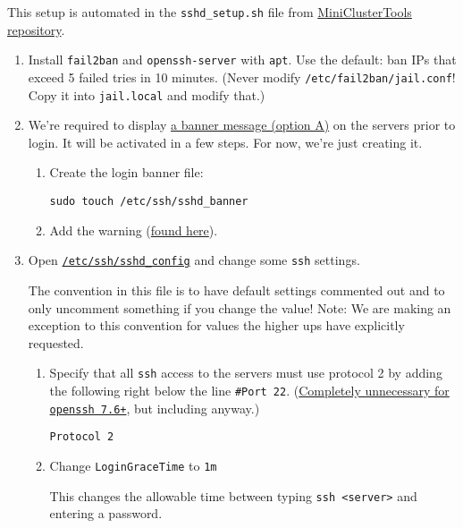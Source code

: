This setup is automated in the \texttt{sshd\_setup.sh} file from \href{https://github.com/coyleej/MiniClusterTools}{MiniClusterTools repository}. 

\begin{enumerate}
\item Install \texttt{fail2ban} and \texttt{openssh-server} with \texttt{apt}. Use the default: ban IPs that exceed 5 failed tries in 10 minutes. (Never modify \texttt{/etc/fail2ban/jail.conf}! Copy it into \texttt{jail.local} and modify that.)

\item We're required to display \href{https://www.stigviewer.com/stig/firewall/2015-09-18/finding/V-3013}{a banner message (option A)} on the servers prior to login. It will be activated in a few steps. For now, we're just creating it.

	\begin{enumerate}
		\item Create the login banner file: 

			\texttt{sudo touch /etc/ssh/sshd\_banner}

		\item Add the warning (\href{https://www.stigviewer.com/stig/firewall/2015-09-18/finding/V-3013}{found here}). 
	\end{enumerate}

\item Open \href{https://linux.die.net/man/5/sshd_config}{\texttt{/etc/ssh/sshd\_config}} and change some \texttt{ssh} settings.

	The convention in this file is to have default settings commented out and to only uncomment something if you change the value! Note: We are making an exception to this convention for values the higher ups have explicitly requested.

	\begin{enumerate}
	\item Specify that all \texttt{ssh} access to the servers must use protocol 2 by adding the following right below the line \texttt{\#Port 22}. (\href{https://www.openssh.com/txt/release-7.6}{Completely unnecessary for \texttt{openssh 7.6+}}, but including anyway.)

		\texttt{Protocol 2}

	\item Change \texttt{LoginGraceTime} to \texttt{1m}

	This changes the allowable time between typing \texttt{ssh <server>} and entering a password.


\end{enumerate}
\end{enumerate}
